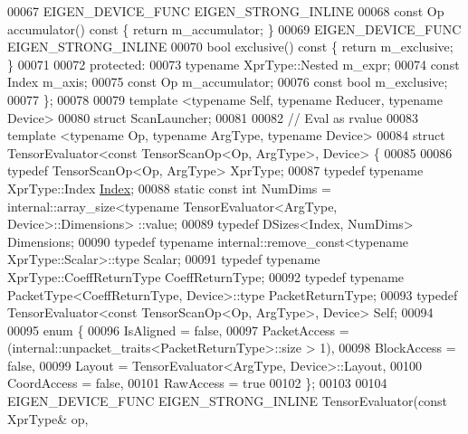 \begin{DoxyCode}
00067   EIGEN\_DEVICE\_FUNC EIGEN\_STRONG\_INLINE
00068   \textcolor{keyword}{const} Op accumulator()\textcolor{keyword}{ const }\{ \textcolor{keywordflow}{return} m\_accumulator; \}
00069   EIGEN\_DEVICE\_FUNC EIGEN\_STRONG\_INLINE
00070   \textcolor{keywordtype}{bool} exclusive()\textcolor{keyword}{ const }\{ \textcolor{keywordflow}{return} m\_exclusive; \}
00071 
00072 \textcolor{keyword}{protected}:
00073   \textcolor{keyword}{typename} XprType::Nested m\_expr;
00074   \textcolor{keyword}{const} Index m\_axis;
00075   \textcolor{keyword}{const} Op m\_accumulator;
00076   \textcolor{keyword}{const} \textcolor{keywordtype}{bool} m\_exclusive;
00077 \};
00078 
00079 \textcolor{keyword}{template} <\textcolor{keyword}{typename} Self, \textcolor{keyword}{typename} Reducer, \textcolor{keyword}{typename} Device>
00080 \textcolor{keyword}{struct }ScanLauncher;
00081 
00082 \textcolor{comment}{// Eval as rvalue}
00083 \textcolor{keyword}{template} <\textcolor{keyword}{typename} Op, \textcolor{keyword}{typename} ArgType, \textcolor{keyword}{typename} Device>
00084 \textcolor{keyword}{struct }TensorEvaluator<const TensorScanOp<Op, ArgType>, Device> \{
00085 
00086   \textcolor{keyword}{typedef} TensorScanOp<Op, ArgType> XprType;
00087   \textcolor{keyword}{typedef} \textcolor{keyword}{typename} XprType::Index \hyperlink{namespace_eigen_a62e77e0933482dafde8fe197d9a2cfde}{Index};
00088   \textcolor{keyword}{static} \textcolor{keyword}{const} \textcolor{keywordtype}{int} NumDims = internal::array\_size<typename TensorEvaluator<ArgType, Device>::Dimensions>
      ::value;
00089   \textcolor{keyword}{typedef} DSizes<Index, NumDims> Dimensions;
00090   \textcolor{keyword}{typedef} \textcolor{keyword}{typename} internal::remove\_const<typename XprType::Scalar>::type Scalar;
00091   \textcolor{keyword}{typedef} \textcolor{keyword}{typename} XprType::CoeffReturnType CoeffReturnType;
00092   \textcolor{keyword}{typedef} \textcolor{keyword}{typename} PacketType<CoeffReturnType, Device>::type PacketReturnType;
00093   \textcolor{keyword}{typedef} TensorEvaluator<const TensorScanOp<Op, ArgType>, Device> Self;
00094 
00095   \textcolor{keyword}{enum} \{
00096     IsAligned = \textcolor{keyword}{false},
00097     PacketAccess = (internal::unpacket\_traits<PacketReturnType>::size > 1),
00098     BlockAccess = \textcolor{keyword}{false},
00099     Layout = TensorEvaluator<ArgType, Device>::Layout,
00100     CoordAccess = \textcolor{keyword}{false},
00101     RawAccess = \textcolor{keyword}{true}
00102   \};
00103 
00104   EIGEN\_DEVICE\_FUNC EIGEN\_STRONG\_INLINE TensorEvaluator(\textcolor{keyword}{const} XprType& op,

\end{DoxyCode}

